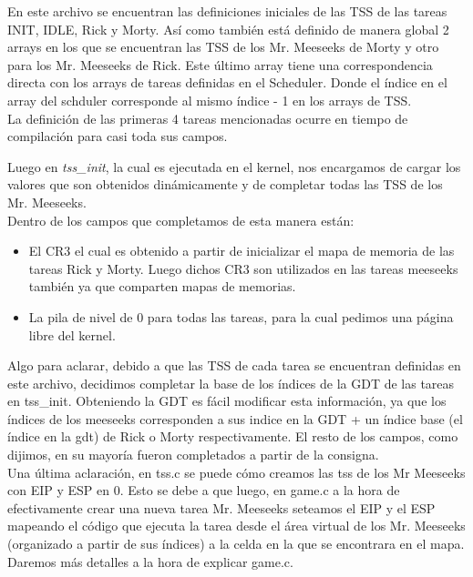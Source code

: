 En este archivo se encuentran las definiciones iniciales de las TSS de las tareas INIT, IDLE, Rick y Morty. Así como también está definido
de manera global 2 arrays en los que se encuentran las TSS de los Mr. Meeseeks de Morty y otro para los Mr. Meeseeks de Rick. Este último array tiene una correspondencia directa con los
arrays de tareas definidas en el Scheduler. Donde el índice en el array del schduler corresponde al mismo índice - 1 en los arrays de TSS. \\
La definición de las primeras 4 tareas mencionadas ocurre en tiempo de compilación para casi toda sus campos.
 
Luego en \emph{tss_init}, la cual es ejecutada en el kernel, nos encargamos de cargar los valores que son obtenidos dinámicamente y de completar todas las TSS de los Mr. Meeseeks.
\\
Dentro de los campos que completamos de esta manera están:
   \begin{itemize}
       \item El CR3 el cual es obtenido a partir de inicializar el mapa de memoria de las tareas Rick y Morty. Luego dichos CR3 son utilizados en las tareas meeseeks también ya que comparten mapas de memorias.
       \item La pila de nivel de 0 para todas las tareas, para la cual pedimos una página libre del kernel.
   \end{itemize}
Algo para aclarar, debido a que las TSS de cada tarea se encuentran definidas en este archivo, decidimos completar la base de los índices de la GDT de las tareas en tss_init.
Obteniendo la GDT es fácil modificar esta información, ya que los índices de los meeseeks corresponden a sus indice en la GDT + un índice base (el índice en la gdt) de Rick o Morty respectivamente. 
El resto de los campos, como dijimos, en su mayoría fueron completados a partir de la consigna.
\\
Una última aclaración, en tss.c se puede cómo creamos las tss de los Mr Meeseeks con EIP y ESP en 0.
Esto se debe a que luego, en game.c a la hora de efectivamente crear una nueva tarea Mr. Meeseeks seteamos el EIP y el ESP mapeando el código que ejecuta la tarea
desde el área virtual de los Mr. Meeseeks (organizado a partir de sus índices) a la celda en la que se encontrara en el mapa. Daremos más detalles
a la hora de explicar game.c.
